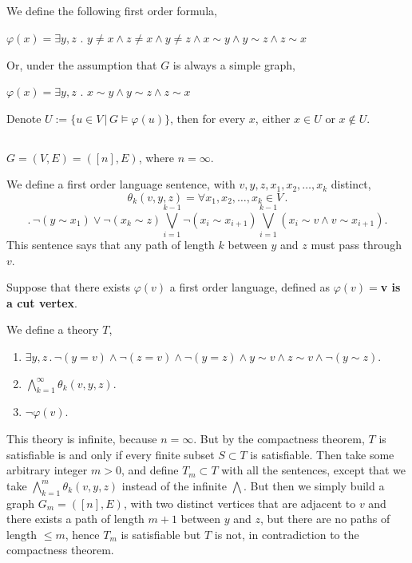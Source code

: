 \documentclass{article}
\begin{document}
\subsection{}
We define the following first order formula,

$\varphi(x)=\exists{y,z}$ . $y\neq{x}\land{z\neq{x}}\land{y\neq{z}}\land{x\sim{y}}\land{y\sim{z}}\land{z\sim{x}}$

Or, under the assumption that $G$ is always a simple graph,

$\varphi(x)=\exists{y,z}$ . $x\sim{y}\land{y\sim{z}}\land{z\sim{x}}$

Denote $U:=\{u\in{V}\,|\,{G\vDash\varphi(u)}\}$, then for every $x$, either $x\in{U}$ or $x\notin{U}$.
\subsection{}
$G=(V,E)=([n],E)$, where $n=\infty$.

We define a first order language sentence, with $v,y,z,x_1,x_2,\dots,x_k$ distinct,
\[\theta_k(v,y,z)=\forall{x_1,x_2,\dots,x_k}\in{V}\,.\]\[.\,\neg(y\sim{x_1})\lor\neg(x_k\sim{z})\bigvee_{i=1}^{k-1}\neg(x_i\sim{x_{i+1}})\bigvee_{i=1}^{k-1}(x_i\sim{v}\land{v\sim{x_{i+1}}}).\]
This sentence says that any path of length $k$ between $y$ and $z$ must pass through $v$.

Suppose that there exists $\varphi(v)$ a first order language, defined as $\varphi(v)=$\textbf{v is a cut vertex}.

We define a theory $T$,
\begin{enumerate}
    \item $\exists{y,z}\,.\,\neg(y=v)\land\neg(z=v)\land\neg(y=z)\land{y\sim{v}}\land{z\sim{v}}\land\neg(y\sim{z})$.
    \item 
    $\bigwedge_{k=1}^\infty\theta_k(v,y,z)$.
    \item 
    $\neg\varphi(v)$.
\end{enumerate}

This theory is infinite, because $n=\infty$. But by the compactness theorem, $T$ is satisfiable is and only if every finite subset $S\subset{T}$ is satisfiable.
Then take some arbitrary integer $m>0$, and define $T_m\subset{T}$ with all the sentences, except that we take $\bigwedge_{k=1}^m\theta_k(v,y,z)$ instead of the infinite $\bigwedge$.
But then we simply build a graph $G_m=([n],E)$, with two distinct vertices that are adjacent to $v$ and there exists a path of length $m+1$ between $y$ and $z$, but there are no paths of length $\leq{m}$, hence $T_m$ is satisfiable but $T$ is not, in contradiction to the compactness theorem.
\end{document}
